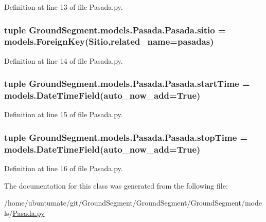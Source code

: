 Definition at line 13 of file Pasada.\+py.

\hypertarget{class_ground_segment_1_1models_1_1_pasada_1_1_pasada_a11b3cdc3860dfd371e447d34fe002767}{}
\subsubsection[{sitio}]{\setlength{\rightskip}{0pt plus 5cm}tuple Ground\+Segment.\+models.\+Pasada.\+Pasada.\+sitio = models.\+Foreign\+Key({\bf Sitio},related\+\_\+name=\textquotesingle{}pasadas\textquotesingle{})\hspace{0.3cm}{\ttfamily [static]}}\label{class_ground_segment_1_1models_1_1_pasada_1_1_pasada_a11b3cdc3860dfd371e447d34fe002767}


Definition at line 14 of file Pasada.\+py.

\hypertarget{class_ground_segment_1_1models_1_1_pasada_1_1_pasada_abceb32f3eb016d4e6d2bee806204242b}{}
\subsubsection[{start\+Time}]{\setlength{\rightskip}{0pt plus 5cm}tuple Ground\+Segment.\+models.\+Pasada.\+Pasada.\+start\+Time = models.\+Date\+Time\+Field(auto\+\_\+now\+\_\+add=True)\hspace{0.3cm}{\ttfamily [static]}}\label{class_ground_segment_1_1models_1_1_pasada_1_1_pasada_abceb32f3eb016d4e6d2bee806204242b}


Definition at line 15 of file Pasada.\+py.

\hypertarget{class_ground_segment_1_1models_1_1_pasada_1_1_pasada_aa26eb2642841aeccd68e417cd3eb4dba}{}
\subsubsection[{stop\+Time}]{\setlength{\rightskip}{0pt plus 5cm}tuple Ground\+Segment.\+models.\+Pasada.\+Pasada.\+stop\+Time = models.\+Date\+Time\+Field(auto\+\_\+now\+\_\+add=True)\hspace{0.3cm}{\ttfamily [static]}}\label{class_ground_segment_1_1models_1_1_pasada_1_1_pasada_aa26eb2642841aeccd68e417cd3eb4dba}


Definition at line 16 of file Pasada.\+py.



The documentation for this class was generated from the following file\+:\begin{DoxyCompactItemize}
\item 
/home/ubuntumate/git/\+Ground\+Segment/\+Ground\+Segment/\+Ground\+Segment/models/\hyperlink{_pasada_8py}{Pasada.\+py}\end{DoxyCompactItemize}

